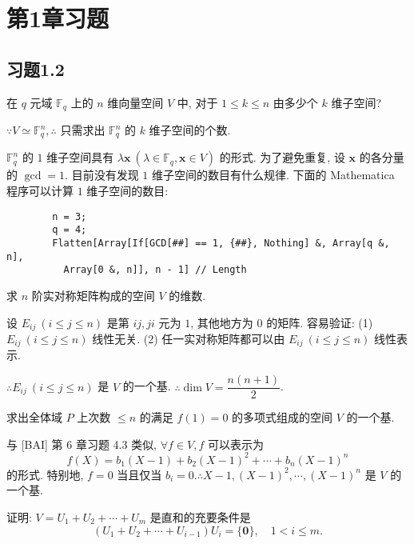 \documentclass{ctexart}
\begin{document}
\section{第1章习题}
\subsection{习题1.2}
\addtocounter{exsection}{2}
\begin{exercise}%
    在 $q$ 元域 $\mathbb{F}_q$ 上的 $n$ 维向量空间 $V$ 中, 对于 $1\leq k\leq n$ 由多少个 $k$ 维子空间?
\end{exercise}
\begin{solution}
    $\because V\simeq\mathbb{F}_q^n,\therefore$ 只需求出 $\mathbb{F}_q^n$ 的 $k$ 维子空间的个数.

    $\mathbb{F}_q^n$ 的 $1$ 维子空间具有 $\lambda\boldsymbol{x}\ (\lambda\in\mathbb{F}_q,\boldsymbol{x}\in V)$ 的形式. 为了避免重复, 设 $\boldsymbol{x}$ 的各分量的 $\gcd=1$. 目前没有发现 $1$ 维子空间的数目有什么规律. 下面的 Mathematica 程序可以计算 $1$ 维子空间的数目:
    \begin{verbatim}
        n = 3;
        q = 4;
        Flatten[Array[If[GCD[##] == 1, {##}, Nothing] &, Array[q &, n], 
          Array[0 &, n]], n - 1] // Length
    \end{verbatim}
\end{solution}
\begin{exercise}[1]\label{ex2.2}
    求 $n$ 阶实对称矩阵构成的空间 $V$ 的维数.
\end{exercise}
\begin{solution}
    设 $E_{ij}\ (i\leq j\leq n)$ 是第 $ij,ji$ 元为 $1$, 其他地方为 $0$ 的矩阵. 容易验证: (1) $E_{ij}\ (i\leq j\leq n)$ 线性无关. (2) 任一实对称矩阵都可以由 $E_{ij}\ (i\leq j\leq n)$ 线性表示.
    
    $\therefore E_{ij}\ (i\leq j\leq n)$ 是 $V$ 的一个基. $\therefore\dim V=\dfrac{n(n+1)}{2}$.
\end{solution}
\begin{exercise}%
    求出全体域 $P$ 上次数 $\leq n$ 的满足 $f(1)=0$ 的多项式组成的空间 $V$ 的一个基.
\end{exercise}
\begin{solution}
    与 [BAI] 第 6 章习题 4.3 类似, $\forall f\in V,f$ 可以表示为
    \[f(X)=b_1(X-1)+b_2(X-1)^2+\cdots+b_n(X-1)^n\]
    的形式. 特别地, $f=0$ 当且仅当 $b_i=0.\therefore X-1,(X-1)^2,\cdots,(X-1)^n$ 是 $V$ 的一个基.
\end{solution}
\begin{exercise}%
    证明: $V=U_1+U_2+\cdots+U_m$ 是直和的充要条件是
    \[(U_1+U_2+\cdots+U_{i-1})U_i=\{\boldsymbol{0}\},\quad 1<i\leq m.\]
\end{exercise}
\end{document}
